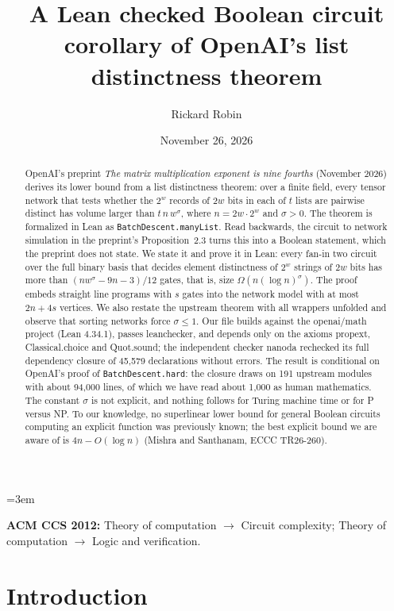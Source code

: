 \documentclass[11pt]{amsart}
\title[A Lean checked Boolean corollary of the list distinctness theorem]{A Lean checked Boolean circuit corollary of OpenAI's list distinctness theorem}
\author{Rickard Robin}
\date{November 26, 2026}
\theoremstyle{definition}
\theoremstyle{remark}
\begin{document}
\emergencystretch=3em
\sloppy

\begin{abstract}
OpenAI's preprint \emph{The matrix multiplication exponent is nine fourths} (November 2026) derives its lower bound from a list distinctness theorem: over a finite field, every tensor network that tests whether the $2^w$ records of $2w$ bits in each of $t$ lists are pairwise distinct has volume larger than $t\,n\,w^{\sigma}$, where $n=2w\cdot 2^w$ and $\sigma>0$. The theorem is formalized in Lean as \texttt{BatchDescent.\allowbreak manyList}. Read backwards, the circuit to network simulation in the preprint's Proposition~2.3 turns this into a Boolean statement, which the preprint does not state. We state it and prove it in Lean: every fan-in two circuit over the full binary basis that decides element distinctness of $2^w$ strings of $2w$ bits has more than $(n w^{\sigma}-9n-3)/12$ gates, that is, size $\Omega(n(\log n)^{\sigma})$. The proof embeds straight line programs with $s$ gates into the network model with at most $2n+4s$ vertices. We also restate the upstream theorem with all wrappers unfolded and observe that sorting networks force $\sigma\le 1$. Our file builds against the openai/math project (Lean 4.34.1), passes leanchecker, and depends only on the axioms propext, Classical.choice and Quot.sound; the independent checker nanoda rechecked its full dependency closure of 45,579 declarations without errors. The result is conditional on OpenAI's proof of \texttt{BatchDescent.\allowbreak hard}: the closure draws on 191 upstream modules with about 94,000 lines, of which we have read about 1,000 as human mathematics. The constant $\sigma$ is not explicit, and nothing follows for Turing machine time or for P versus NP. To our knowledge, no superlinear lower bound for general Boolean circuits computing an explicit function was previously known; the best explicit bound we are aware of is $4n-O(\log n)$ (Mishra and Santhanam, ECCC TR26-260).
\end{abstract}

\maketitle

\noindent\textbf{ACM CCS 2012:} Theory of computation $\to$ Circuit complexity; Theory of computation $\to$ Logic and verification.

\section{Introduction}\label{sec:intro}
\end{document}
